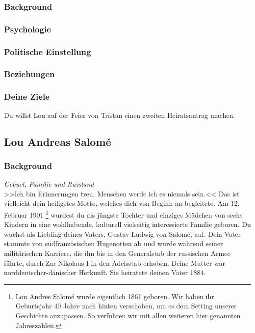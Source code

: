 \documentclass[12pt, a4paper, openany]{report}
\begin{document}
\subsubsection{Background}
\subsubsection{Psychologie}
\subsubsection{Politische Einstellung}
\subsubsection{Beziehungen}
\subsubsection{Deine Ziele}
Du willst Lou auf der Feier von Tristan einen zweiten Heiratsantrag machen.

\subsection{Lou Andreas Salomé}
\subsubsection{Background}

\textit{Geburt, Familie und Russland}\\
>>Ich bin Erinnerungen treu, Menschen werde ich es niemals sein.<< 
Das ist vielleicht dein heiligstes Motto, welches dich von Beginn an begleitete.
Am 12. Februar 1901%
\footnote{
  Lou Andres Salomé wurde eigentlich 1861 geboren. 
  Wir haben ihr Geburtsjahr 40 Jahre nach hinten verschoben, um es dem Setting unserer Geschichte anzupassen. 
  So verfuhren wir mit allen weiteren hier genannten Jahreszahlen.
}
wurdest du als jüngste Tochter und einziges Mädchen von sechs Kindern in eine wohlhabende, kulturell vielseitig interessierte Familie geboren. 
Du wuchst als Liebling deines Vaters, Gustav Ludwig von Salomé, auf. 
Dein Vater stammte von südfranzösischen Hugenotten ab und wurde während seiner militärischen Karriere, die ihn bis in den Generalstab der russischen Armee führte, durch Zar Nikolaus I in den Adelsstab erhoben.
Deine Mutter war norddeutscher-dänischer Herkunft. 
Sie heiratete deinen Vater 1884.
\end{document}
